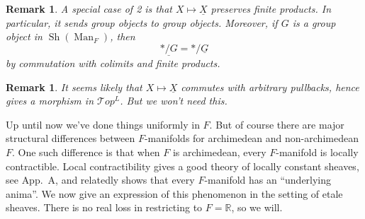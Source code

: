 \documentclass[12pt]{article}
\newtheorem{remark}[theorem]{Remark}
\newcommand{\on}{\operatorname}
\newcommand{\mc}{\mathcal}
\begin{document}
\begin{remark}
A special case of 2 is that $X\mapsto \underline{X}$ preserves finite products.  In particular, it sends group objects to group objects.  Moreover, if $G$ is a group object in $\on{Sh}(\on{Man}_F)$, then
$$\underline{\ast/G} = \ast/\underline{G}$$
by commutation with colimits and finite products.
\end{remark}

\begin{remark}
It seems likely that $X\mapsto \underline{X}$ commutes with arbitrary pullbacks, hence gives a morphism in $\mc{T}op^L$.  But we won't need this.
\end{remark}

Up until now we've done things uniformly in $F$.  But of course there are major structural differences between $F$-manifolds for archimedean and non-archimedean $F$.  One such difference is that when $F$ is archimedean, every $F$-manifold is locally contractible.  Local contractibility gives a good theory of locally constant sheaves, see \cite{LurieHA} App.\ A, and relatedly shows that every $F$-manifold has an ``underlying anima''.  We now give an expression of this phenomenon in the setting of etale sheaves.  There is no real loss in restricting to $F=\mathbb{R}$, so we will.
\end{document}
